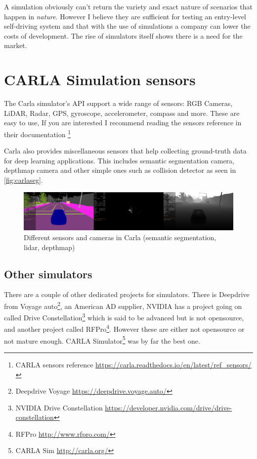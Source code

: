 A simulation obviously can't return the variety and exact nature of scenarios
that happen in \emph{nature}. However I believe they are sufficient for testing
an entry-level self-driving system and that with the use of simulations a
company can lower the costs of development. The rise of simulators itself shows
there is a need for the market.

\section{CARLA Simulation sensors}

The Carla simulator's API support a wide range of sensors: RGB Cameras, LiDAR,
Radar, GPS, gyroscope, accelerometer, compass and more. These are easy to
use, If you are interested I recommend reading the sensors reference in their
documentation \footnote{CARLA sensors reference
\url{https://carla.readthedocs.io/en/latest/ref_sensors/}}

Carla also provides miscellaneous sensors that help collecting ground-truth data
for deep learning applications. This includes semantic segmentation camera,
depthmap camera and other simple ones such as collision detector as seen in \autoref{fig:carlaseg}.

\begin{figure}[!ht]
  \centering
  \includegraphics[width=150mm, keepaspectratio]{figures/carlaseg.png}
  \caption{Different sensors and cameras in Carla (semantic segmentation, lidar, depthmap)}
  \label{fig:carlaseg}
\end{figure}

\subsection{Other simulators}

There are a couple of other dedicated projects for simulators. There is
Deepdrive from Voyage auto\footnote{Deepdrive Voyage
\url{https://deepdrive.voyage.auto/}}, an American AD supplier, NVIDIA has a
project going on called Drive Constellation\footnote{NVIDIA Drive Constellation
\url{https://developer.nvidia.com/drive/drive-constellation}} which
is said to be advanced but is not opensource, and another project called
RFPro\footnote{RFPro \url{http://www.rfpro.com/}}. However these are either not
opensource or not mature enough. CARLA Simulator\footnote{CARLA Sim
\url{http://carla.org/}} was by far the best one.